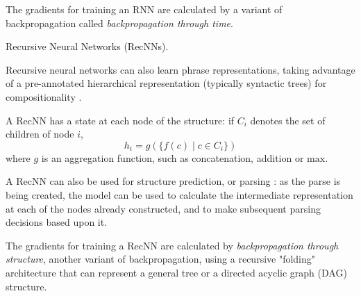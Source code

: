 \documentclass[12pt]{article}
\makeatletter
\renewcommand{\paragraph}{
  \@startsection{paragraph}{4}
  {\z@}{.3ex \@plus .3ex \@minus .2ex}{-1em}
  {\normalfont\normalsize\bfseries}
}
\makeatother
\begin{document}
The gradients for training an RNN are calculated by a variant of backpropagation
called \textit{backpropagation through time}.

\paragraph{Recursive Neural Networks (RecNNs).}

Recursive neural networks can also learn phrase representations, taking advantage
of a pre-annotated hierarchical representation (typically syntactic trees) for
compositionality \cite{socher2010learning}.

A RecNN has a state at each node of the structure: if $C_i$ denotes the set of children of
node $i$,
\[
  h_i=g(\{f(c)\;|\;c\in C_i\})
\]
where $g$ is an aggregation function, such as concatenation, addition or $\mathrm{max}$.

A RecNN can also be used for structure prediction, or parsing
\cite{socher2013recursive,dyer2015transition}: as the parse is being created, the model can
be used to calculate the intermediate representation at each of the nodes already constructed,
and to make subsequent parsing decisions based upon it.

The gradients for training a RecNN are calculated by \textit{backpropagation
through structure}, another variant of backpropagation, using a recursive
"folding" architecture that can represent a general tree or a directed acyclic
graph (DAG) structure\cite{goller1996learning}.
\end{document}
